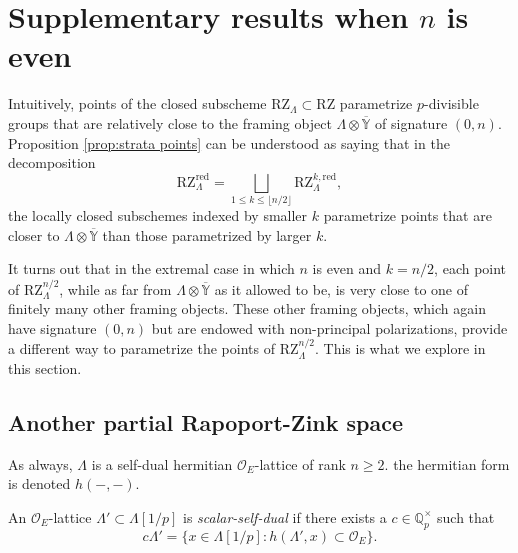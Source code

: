 \documentclass[11pt]{alggeom}
\newcommand{\red}{\mathrm{red}}
\newcommand{\Q}{\mathbb Q}
\newcommand{\co}{\mathcal O}
\begin{document}

\section{Supplementary results when $n$ is even}
\label{s:extremal supplement}



Intuitively,  points of the closed subscheme $\mathrm{RZ}_\Lambda \subset \mathrm{RZ}$ parametrize $p$-divisible groups  that are relatively close to the framing object $\Lambda \otimes   \overline{\mathbb{Y}}$ of signature $(0,n)$.   
Proposition \ref{prop:strata points} can be understood as saying that in the decomposition
\[
\mathrm{RZ}^\red_\Lambda = \bigsqcup_{1 \le k \le \lfloor n/2 \rfloor } \mathrm{RZ}_\Lambda^{k,\red},
\]
 the locally closed subschemes indexed by smaller $k$ parametrize points that are closer to $\Lambda \otimes   \overline{\mathbb{Y}}$ than those parametrized by larger $k$.

It turns out that in the extremal case in which $n$ is even and $k=n/2$, each point of $ \mathrm{RZ}_\Lambda^{n/2}$, while as far  from $\Lambda \otimes   \overline{\mathbb{Y}}$ as it allowed to be, is very close to one of finitely many other framing objects.
 These other framing objects, which again have signature $(0,n)$ but are endowed with  non-principal polarizations,   provide a different way to parametrize the points of $ \mathrm{RZ}_\Lambda^{n/2}$.  This is what we explore in this section.




\subsection{Another partial Rapoport-Zink space}


As always, $\Lambda$ is a self-dual hermitian $\co_E$-lattice of rank $n\ge 2$.
the hermitian form is denoted $h(-,-)$.


\begin{definition}\label{def:scalar dual}
An $\co_E$-lattice $\Lambda' \subset \Lambda[1/p]$ is \emph{scalar-self-dual} if there exists a $c\in \Q_p^\times$ such that 
\[
c \Lambda' = \{ x \in \Lambda[1/p] : h(\Lambda',x) \subset \co_E \}.
\]
\end{definition}
\end{document}
